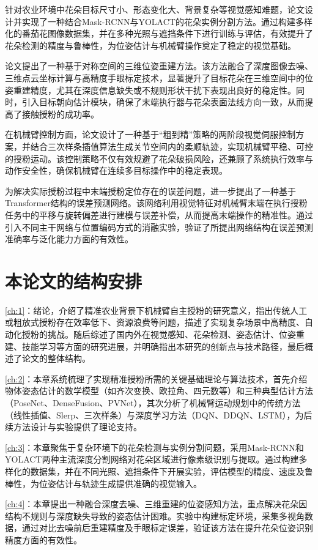 针对农业环境中花朵目标尺寸小、形态变化大、背景复杂等视觉感知难题，论文设计并实现了一种结合Mask-RCNN与YOLACT的花朵实例分割方法。通过构建多样化的番茄花图像数据集，并在多种光照与遮挡条件下进行训练与评估，有效提升了花朵检测的精度与鲁棒性，为位姿估计与机械臂操作奠定了稳定的视觉基础。

论文提出了一种基于对称空间的三维位姿重建方法。该方法融合了深度图像去噪、三维点云坐标计算与高精度手眼标定技术，显著提升了目标花朵在三维空间中的位姿重建精度，尤其在深度信息缺失或不规则形状干扰下表现出良好的稳定性。同时，引入目标朝向估计模块，确保了末端执行器与花朵表面法线方向一致，从而提高了接触授粉的成功率。

在机械臂控制方面，论文设计了一种基于“粗到精”策略的两阶段视觉伺服控制方案，并结合三次样条插值算法生成关节空间内的柔顺轨迹，实现机械臂平稳、可控的授粉运动。该控制策略不仅有效规避了花朵破损风险，还兼顾了系统执行效率与动作安全性，确保机械臂在连续多目标操作中的稳定表现。

为解决实际授粉过程中末端授粉定位存在的误差问题，进一步提出了一种基于Transformer结构的误差预测网络。该网络利用视觉特征对机械臂末端在执行授粉任务中的平移与旋转偏差进行建模与误差补偿，从而提高末端操作的精准性。通过引入不同主干网络与位置编码方式的消融实验，验证了所提出网络结构在误差预测准确率与泛化能力方面的有效性。


\section{本论文的结构安排}
\cref{ch:1}：绪论，介绍了精准农业背景下机械臂自主授粉的研究意义，指出传统人工或粗放式授粉存在效率低下、资源浪费等问题，描述了实现复杂场景中高精度、自动化授粉的挑战。随后综述了国内外在视觉感知、花朵检测、姿态估计、位姿重建、技能学习等方面的研究进展，并明确指出本研究的创新点与技术路径，最后概述了论文的整体结构。

\cref{ch:2}：本章系统梳理了实现精准授粉所需的关键基础理论与算法技术，首先介绍物体姿态估计的数学模型（如齐次变换、欧拉角、四元数等）和三种典型估计方法（PoseNet、DenseFusion、PVNet），其次分析了机械臂运动规划中的传统方法（线性插值、Slerp、三次样条）与深度学习方法（DQN、DDQN、LSTM），为后续方法设计与实验提供了理论支持。

\cref{ch:3}：本章聚焦于复杂环境下的花朵检测与实例分割问题，采用Mask-RCNN和YOLACT两种主流深度分割网络对花朵区域进行像素级识别与提取。通过构建多样化的数据集，并在不同光照、遮挡条件下开展实验，评估模型的精度、速度及鲁棒性，为位姿估计与轨迹生成提供准确的视觉输入。

\cref{ch:4}：本章提出一种融合深度去噪、三维重建的位姿感知方法，重点解决花朵因结构不规则与深度缺失导致的姿态估计困难。实验中构建标定环境，采集多视角数据，通过对比去噪前后重建精度及手眼标定误差，验证该方法在提升花朵位姿识别精度方面的有效性。

